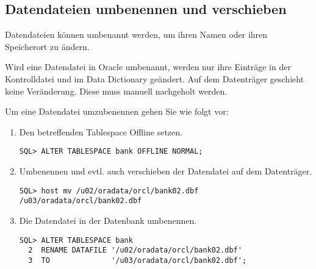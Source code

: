       \subsection{Datendateien umbenennen und verschieben}
        Datendateien können umbenannt werden, um ihren Namen oder ihren Speicherort zu ändern.
        \begin{merke}
          Wird eine Datendatei in Oracle umbenannt, werden nur ihre Einträge in der Kontrolldatei und im Data Dictionary geändert. Auf dem Datenträger geschieht keine Veränderung. Diese muss manuell nachgeholt werden.
        \end{merke}
        Um eine Datendatei umzubenennen gehen Sie wie folgt vor:
        \begin{enumerate}
          \item Den betreffenden Tablespace Offline setzen.
          \begin{lstlisting}[caption={Tablespace Offline setzen},label=admin127,language=oracle_sql]
SQL> ALTER TABLESPACE bank OFFLINE NORMAL;
          \end{lstlisting}
          \item Umbenennen und evtl. auch verschieben der Datendatei auf dem Datenträger.
          \begin{lstlisting}[caption={Tablespace Offline setzen},label=admin127a,language=oracle_sql,alsolanguage=sqlplus]
SQL> host mv /u02/oradata/orcl/bank02.dbf /u03/oradata/orcl/bank02.dbf
          \end{lstlisting}
          \item Die Datendatei in der Datenbank umbenennen.
          \begin{lstlisting}[caption={Datendatei umbenennen},label=admin128,language=oracle_sql]
SQL> ALTER TABLESPACE bank
  2  RENAME DATAFILE '/u02/oradata/orcl/bank02.dbf'
  3  TO              '/u03/oradata/orcl/bank02.dbf';
          \end{lstlisting}
        \end{enumerate}
